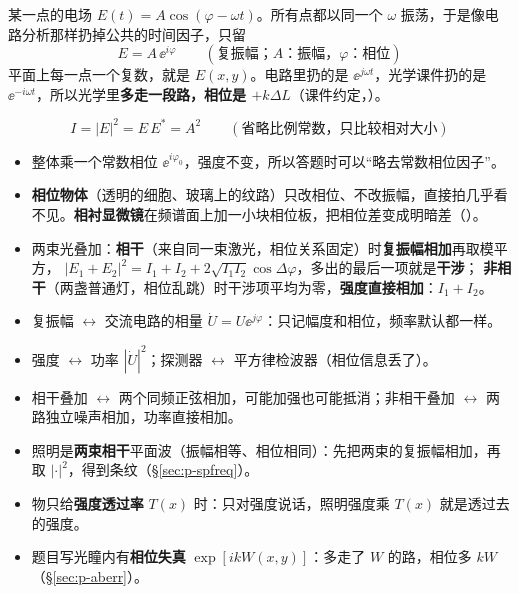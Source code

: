 某一点的电场 $E(t)=A\cos(\varphi-\omega t)$。所有点都以同一个 $\omega$ 振荡，于是像电路分析那样扔掉公共的时间因子，只留
\[
E=A\,\ee^{i\varphi}\qquad(\text{复振幅；}A\text{：振幅，}\varphi\text{：相位})
\]
平面上每一点一个复数，就是 $E(x,y)$。电路里扔的是 $\ee^{j\omega t}$，光学课件扔的是 $\ee^{-i\omega t}$，所以光学里\textbf{多走一段路，相位是 $+k\Delta L$}（课件约定，\pageref{ch:wave}）。

\[
I=|E|^2=E\,E^*=A^2\qquad(\text{省略比例常数，只比较相对大小})
\]
\begin{itemize}
\item 整体乘一个常数相位 $\ee^{i\varphi_0}$，强度不变，所以答题时可以“略去常数相位因子”。
\item \textbf{相位物体}（透明的细胞、玻璃上的纹路）只改相位、不改振幅，直接拍几乎看不见。\textbf{相衬显微镜}在频谱面上加一小块相位板，把相位差变成明暗差（\pageref{sec:phasecontrast}）。
\item 两束光叠加：\textbf{相干}（来自同一束激光，相位关系固定）时\textbf{复振幅相加}再取模平方，
$|E_1+E_2|^2=I_1+I_2+2\sqrt{I_1I_2}\cos\Delta\varphi$，多出的最后一项就是\textbf{干涉}；
\textbf{非相干}（两盏普通灯，相位乱跳）时干涉项平均为零，\textbf{强度直接相加}：$I_1+I_2$。
\end{itemize}

\begin{idea}[类比]
\begin{itemize}
\item 复振幅 $\leftrightarrow$ 交流电路的相量 $\dot U=U\ee^{j\varphi}$：只记幅度和相位，频率默认都一样。
\item 强度 $\leftrightarrow$ 功率 $|\dot U|^2$；探测器 $\leftrightarrow$ 平方律检波器（相位信息丢了）。
\item 相干叠加 $\leftrightarrow$ 两个同频正弦相加，可能加强也可能抵消；非相干叠加 $\leftrightarrow$ 两路独立噪声相加，功率直接相加。
\end{itemize}
\end{idea}

\pkao
\begin{itemize}
\item 照明是\textbf{两束相干}平面波（振幅相等、相位相同）：先把两束的复振幅相加，再取 $|\cdot|^2$，得到条纹（§\ref{sec:p-spfreq}）。
\item 物只给\textbf{强度透过率} $T(x)$ 时：只对强度说话，照明强度乘 $T(x)$ 就是透过去的强度。
\item 题目写光瞳内有\textbf{相位失真} $\exp[ikW(x,y)]$：多走了 $W$ 的路，相位多 $kW$（§\ref{sec:p-aberr}）。
\end{itemize}

